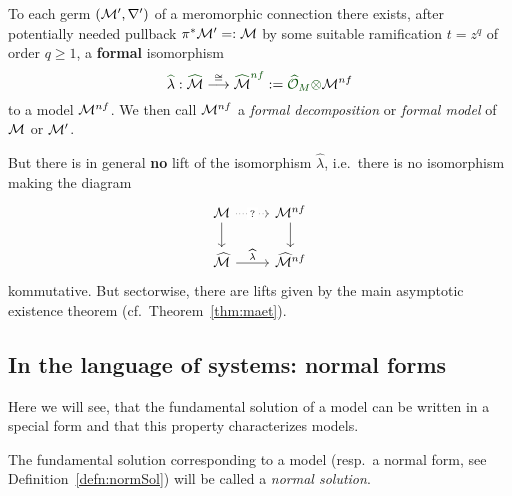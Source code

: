 \begin{thm}\label{thm:leveltTurittin}
  To each germ $(\mathcal{M}',\nabla')$ of a meromorphic connection there exists, after
  potentially needed pullback $\pi^{*}\textcolor{black}{\mathcal{M}'}=:\mathcal{M}$ by some
  suitable ramification $t=z^q$ of order $q\geq1$, a
  \textcolor{green!30!black}{\textbf{formal}} isomorphism
  \[
    \textcolor{green!30!black}{\hat{\textcolor{black}{\lambda}}}:
    \textcolor{green!30!black}{\hat{\textcolor{black}{\cM}}}
    \overset{\cong}\longrightarrow
    \textcolor{green!30!black}{\hat{\textcolor{black}{\cM}}^{nf}}
    :=\textcolor{green!30!black}{\hat\cO_M\otimes}\cM^{nf}
  \]
  to a model $\mathcal{M}^{nf}$.
  We then call $\mathcal{M}^{nf}$ a \emph{formal decomposition} or \emph{formal model}
  of $\mathcal{M}$ or $\mathcal{M}'$.
  \begin{rem}
    But there is in general \textbf{no} lift of the isomorphism $\hat\lambda$,
    i.e.\ there is no isomorphism making the diagram
    \[ \begin{tikzcd}
        \cM \dar \arrow[dotted]{r}[description]{?} & \cM^{nf} \dar
        \\\hat\cM \rar{\hat\lambda} & \hat\cM^{nf}
    \end{tikzcd} \]
    kommutative.
    But sectorwise, there are lifts given by the main asymptotic existence
    theorem (cf.\ Theorem~\ref{thm:maet}).
  \end{rem}
\end{thm}
\begin{comment}
  \begin{proof}
    See \TODO{}
  \end{proof}
\end{comment}

\subsection{In the language of systems: normal forms}\label{sec:normalForms}
Here we will see, that the fundamental solution of a model can be written in a
special form and that this property characterizes models.
\begin{defn}
  The fundamental solution corresponding to a model (resp.\ a normal form, see
  Definition~\ref{defn:normSol}) will be called a
  \emph{normal solution}.
\end{defn}

